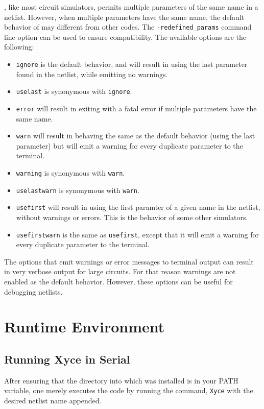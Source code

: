\Xyce{}, like most circuit simulators, permits multiple parameters of the same name in a netlist.  
However, when multiple parameters have the same name, the default behavior of \Xyce{} may different from other codes.
The \texttt{-redefined\_params} command line option can be used to ensure compatibility.  The available options are the following:
\begin{itemize}
  \item \verb+ignore+ is the default behavior, and will result in \Xyce{} using the last parameter found in the netlist, while emitting no warnings.
  \item \verb+uselast+ is synonymous with \verb+ignore+.
  \item \verb+error+ will result in \Xyce{} exiting with a fatal error if multiple parameters have the same name.
  \item \verb+warn+ will result in \Xyce{} behaving the same as the default behavior (using the last parameter) but will emit a warning for every duplicate parameter to the terminal.
  \item \verb+warning+ is synonymous with \verb+warn+.
  \item \verb+uselastwarn+ is synonymous with \verb+warn+.
  \item \verb+usefirst+ will result in \Xyce{} using the first paramter of a given name in the netlist, without warnings or errors.  This is the behavior of some other simulators.
  \item \verb+usefirstwarn+ is the same as \verb+usefirst+, except that it will emit a warning for every duplicate parameter to the terminal.
\end{itemize}
The options that emit warnings or error messages to terminal output can result in very verbose output for large circuits.  
For that reason warnings are not enabled as the default behavior.  However, these options can be useful for debugging netlists.

\chapter{Runtime Environment}
\label{runtime}

\section{Running Xyce in Serial}

After ensuring that the directory into which \Xyce{} was installed is
in your PATH variable, one merely executes the code by running the
command, \texttt{Xyce} with the desired netlist name appended.

